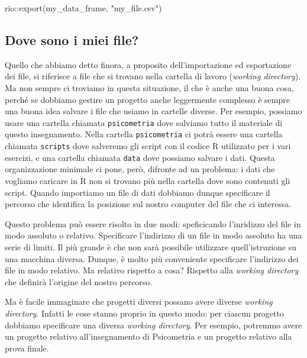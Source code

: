 \documentclass[
]{memoir}
\newenvironment{Shaded}{\begin{snugshade}}{\end{snugshade}}
\newcommand{\FunctionTok}[1]{\textcolor[rgb]{0.00,0.00,0.00}{#1}}
\newcommand{\NormalTok}[1]{#1}
\newcommand{\SpecialCharTok}[1]{\textcolor[rgb]{0.00,0.00,0.00}{#1}}
\newcommand{\StringTok}[1]{\textcolor[rgb]{0.31,0.60,0.02}{#1}}
\theoremstyle{definition}
\theoremstyle{definition}
\theoremstyle{definition}
\theoremstyle{definition}
\theoremstyle{remark}
\begin{document}
\begin{Shaded}
\begin{Highlighting}[]
\NormalTok{rio}\SpecialCharTok{::}\FunctionTok{export}\NormalTok{(my\_data\_frame, }\StringTok{"my\_file.csv"}\NormalTok{)}
\end{Highlighting}
\end{Shaded}

\hypertarget{dove-sono-i-miei-file}{%
\subsection{Dove sono i miei file?}\label{dove-sono-i-miei-file}}

Quello che abbiamo detto finora, a proposito dell'importazione ed esportazione dei file, si riferisce a file che si trovano nella cartella di lavoro (\emph{working directory}). Ma non sempre ci troviamo in questa situazione, il che è anche una buona cosa, perché se dobbiamo gestire un progetto anche leggermente complesso è sempre una buona idea salvare i file che usiamo in cartelle diverse. Per esempio, possiamo usare una cartella chiamata \texttt{psicometria} dove salviamo tutto il materiale di questo insegnamento. Nella cartella \texttt{psicometria} ci potrà essere una cartella chiamata \texttt{scripts} dove salveremo gli script con il codice R utilizzato per i vari esercizi, e una cartella chiamata \texttt{data} dove possiamo salvare i dati. Questa organizzazione minimale ci pone, però, difronte ad un problema: i dati che vogliamo caricare in R non si trovano più nella cartella dove sono contenuti gli script. Quando importiamo un file di dati dobbiamo dunque specificare il percorso che identifica la posizione sul nostro computer del file che ci interessa.

Questo problema può essere risolto in due modi: speficicando l'inridizzo del file in modo assoluto o relativo. Specificare l'indirizzo di un file in modo assoluto ha una serie di limiti. Il più grande è che non sarà possibile utilizzare quell'istruzione su una macchina diversa. Dunque, è molto più conveniente specificare l'indirizzo dei file in modo relativo. Ma relativo rispetto a cosa? Rispetto alla \emph{working directory} che definirà l'origine del nostro percorso.

Ma è facile immaginare che progetti diversi possano avere diverse \emph{working directory}. Infatti le cose stanno proprio in questo modo: per ciascun progetto dobbiamo specificare una diversa \emph{working directory}. Per esempio, potremmo avere un progetto relativo all'insegnamento di Psicometria e un progetto relativo alla prova finale.
\end{document}
